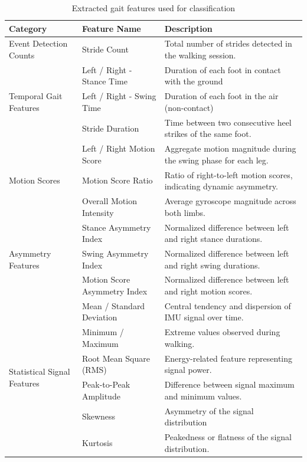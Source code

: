 \begin{table}
    \renewcommand{\arraystretch}{1.2}
    \caption{Extracted gait features used for classification}
    \label{table:features}
    \centering
    \begin{tabular}{|p{3cm}|p{4cm}|p{7.5cm}|}
    \hline
    \textbf{Category} & \textbf{Feature Name} & \textbf{Description} \\
    \hline
    \multirow{1}{*}{Event Detection Counts} 
    & Stride Count & Total number of strides detected in the walking session. \\
    \hline

    \multirow{3}{*}{Temporal Gait Features} 
    & Left / Right - Stance Time & Duration of each foot in contact with the ground  \\
    & Left / Right - Swing Time & Duration of each foot in the air (non-contact)      \\
    & Stride Duration & Time between two consecutive heel strikes of the same foot.    \\
    \hline

    \multirow{3}{*}{Motion Scores} 
    & Left / Right Motion Score & Aggregate motion magnitude during the swing phase for each leg. \\
    & Motion Score Ratio & Ratio of right-to-left motion scores, indicating dynamic asymmetry.     \\
    & Overall Motion Intensity & Average gyroscope magnitude across both limbs.                     \\
    \hline

    \multirow{3}{*}{Asymmetry Features} 
    & Stance Asymmetry Index & Normalized difference between left and right stance durations.  \\
    & Swing Asymmetry Index & Normalized difference between left and right swing durations.     \\
    & Motion Score Asymmetry Index & Normalized difference between left and right motion scores. \\
    \hline

    \multirow{6}{*}{Statistical Signal Features}
    & Mean / Standard Deviation & Central tendency and dispersion of IMU signal over time. \\
    & Minimum / Maximum & Extreme values observed during walking.                           \\
    & Root Mean Square (RMS) & Energy-related feature representing signal power.             \\
    & Peak-to-Peak Amplitude & Difference between signal maximum and minimum values.          \\
    & Skewness            & Asymmetry of the signal distribution                               \\
    & Kurtosis            & Peakedness or flatness of the signal distribution.                  \\
    \hline
    \end{tabular}
\end{table}


